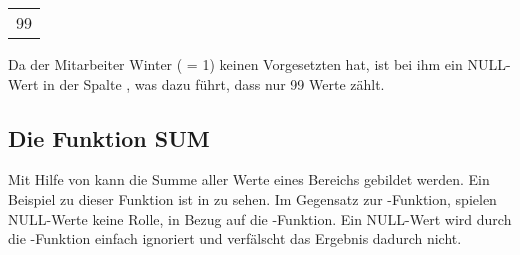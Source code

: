 \begin{center}
    \begin{small}
        \tablehead{}
        \begin{msoraclesql}
            \begin{supertabular}{r}
                99 \\
            \end{supertabular}
        \end{msoraclesql}
    \end{small}
\end{center}
Da der Mitarbeiter Winter ( = 1) keinen Vorgesetzten hat, ist bei ihm ein NULL-Wert in der Spalte , was dazu führt, dass  nur 99 Werte zählt.
\subsection{Die Funktion SUM}
Mit Hilfe von  kann die Summe aller Werte eines Bereichs gebildet werden. Ein Beispiel zu dieser Funktion ist in  zu sehen. Im Gegensatz zur -Funktion, spielen NULL-Werte keine Rolle, in Bezug auf die -Funktion. Ein NULL-Wert wird durch die -Funktion einfach ignoriert und verfälscht das Ergebnis dadurch nicht.
